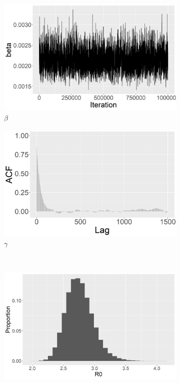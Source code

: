 \documentclass[11pt]{article}
\begin{document}
	\begin{figure}
		\centering
		\begin{subfigure}[b]{0.41\textwidth}
			\centering
			\includegraphics[width=\textwidth]{E1_no_burn_beta_tp}
			\caption{$\beta$}
			\label{fig:traceplot_beta}
		\end{subfigure}
		\hfill
		\begin{subfigure}[b]{0.41\textwidth}
			\centering
			\includegraphics[width=\textwidth]{E1_burn_beta_acf}
			\caption{$\gamma$}
			\label{fig:traceplot_gamma}
		\end{subfigure}
		\\
		\begin{subfigure}[b]{0.41\textwidth}
			\centering
			\includegraphics[width=\textwidth]{E1_no_burn_R0_hist}

\end{subfigure}
\end{figure}
\end{document}
